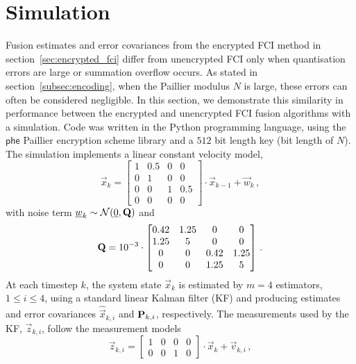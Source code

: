 \documentclass[letterpaper, 10 pt, conference]{ieeeconf}
\begin{document}
\section{Simulation}\label{sec:simulation}
Fusion estimates and error covariances from the encrypted FCI method in section~\ref{sec:encrypted_fci} differ from unencrypted FCI only when quantisation errors are large or summation overflow occurs. As stated in section~\ref{subsec:encoding}, when the Paillier modulus $N$ is large, these errors can often be considered negligible. In this section, we demonstrate this similarity in performance between the encrypted and unencrypted FCI fusion algorithms with a simulation. Code was written in the Python programming language, using the $\mathsf{phe}$ Paillier encryption scheme library \cite{PythonPaillier2013} and a $512$ bit length key (bit length of $N$). The simulation implements a linear constant velocity model,
\begin{equation}\label{eqn:sim_sys_model}
    \vec{x}_k =
    \begin{bmatrix}
        1 & 0.5 & 0 & 0\\
        0 & 1 & 0 & 0\\
        0 & 0 & 1 & 0.5\\
        0 & 0 & 0 & 0
    \end{bmatrix}
    \cdot \vec{x}_{k-1} + \vec{w}_k\,,
\end{equation}
with noise term ${\underline{w}}_k \sim \mathcal{N}({\underline{0}}, {{\mathbf{Q}}})$ and
\begin{equation}
    {\ensuremath{{\mathbf{Q}}}} = 10^{-3} \cdot
    \begin{bmatrix}
        0.42 & 1.25 & 0 & 0\\
        1.25 & 5 & 0 & 0\\
        0 & 0 & 0.42 & 1.25\\
        0 & 0 & 1.25 & 5
    \end{bmatrix}\,.
\end{equation}
At each timestep $k$, the system state $\vec{x}_k$ is estimated by $m=4$ estimators, $1\leq i \leq 4$, using a standard linear Kalman filter (KF) \cite{haugBayesianEstimationTracking2012} and producing estimates and error covariances $\hat{\vec{x}}_{k,i}$ and ${{\mathbf{P}}}_{k,i}$, respectively. The measurements used by the KF, $\vec{z}_{k,i}$, follow the measurement models
\begin{equation}
    \vec{z}_{k,i} = 
    \begin{bmatrix}
        1 & 0 & 0 & 0\\
        0 & 0 & 1 & 0
    \end{bmatrix}
    \cdot \vec{x}_k + \vec{v}_{k,i}\,,
\end{equation}
\end{document}
